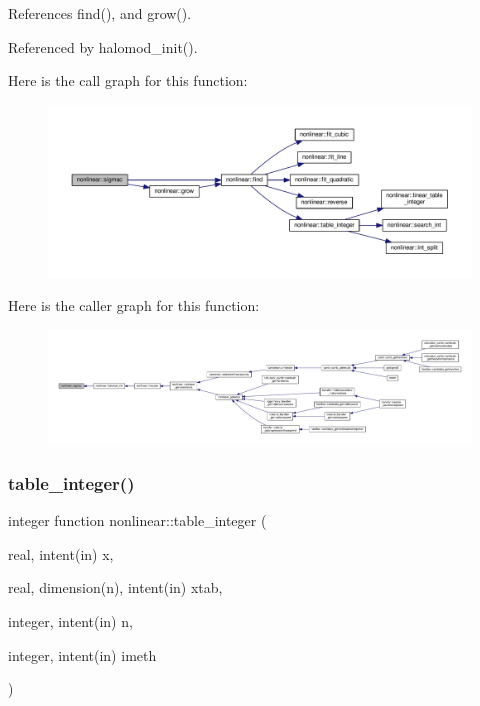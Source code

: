 References find(), and grow().



Referenced by halomod\+\_\+init().

Here is the call graph for this function\+:
\nopagebreak
\begin{figure}[H]
\begin{center}
\leavevmode
\includegraphics[width=350pt]{namespacenonlinear_a2b1a2fe15822f8bfcf88ca9de9060e85_cgraph}
\end{center}
\end{figure}
Here is the caller graph for this function\+:
\nopagebreak
\begin{figure}[H]
\begin{center}
\leavevmode
\includegraphics[width=350pt]{namespacenonlinear_a2b1a2fe15822f8bfcf88ca9de9060e85_icgraph}
\end{center}
\end{figure}
\mbox{\label{namespacenonlinear_a9982a6cac80109ad36dd796e77f372de}} 
\subsubsection{\texorpdfstring{table\+\_\+integer()}{table\_integer()}}
{\footnotesize\ttfamily integer function nonlinear\+::table\+\_\+integer (\begin{DoxyParamCaption}\item[{real, intent(in)}]{x,  }\item[{real, dimension(n), intent(in)}]{xtab,  }\item[{integer, intent(in)}]{n,  }\item[{integer, intent(in)}]{imeth }\end{DoxyParamCaption})\hspace{0.3cm}{\ttfamily [private]}}



